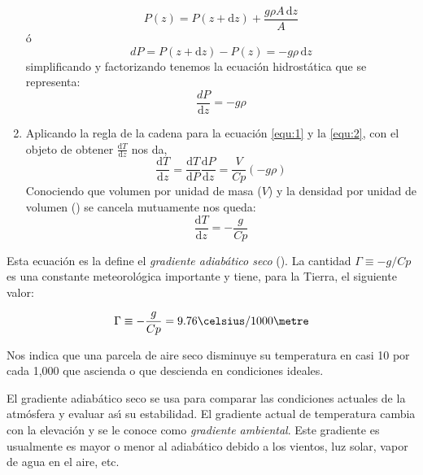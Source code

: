 \begin{enumerate}
\begin{equation}
P(z) = P(z+\mathrm{d}z) +\frac{g \rho A\,\mathrm{d}z}{A}
\end{equation}
\'o
\begin{equation}
dP =P(z+\mathrm{d}z) - P(z) = -g\rho\, \mathrm{d}z
\end{equation}
simplificando y factorizando tenemos la ecuaci\'on hidrost\'atica que se representa:
\begin{equation}
\frac{dP}{\mathrm{d}z}= -g\rho
\label{equ:2}
\end{equation}
\item Aplicando la regla de la cadena para  la ecuaci\'on \ref{equ:1}  y la   \ref{equ:2}, 
con el objeto de obtener $\frac{\mathrm{d}T}{\mathrm{d}z}$ nos da,
\begin{equation}
\frac{\mathrm{d}T}{\mathrm{d}z}=\frac{\mathrm{d}T}{\mathrm{d}P}\frac{\mathrm{d}P}{\mathrm{d}z} =\frac{V}{Cp}(-g\rho)
\end{equation}
Conociendo que volumen por unidad de masa ($V$) y la densidad por unidad de volumen () se cancela mutuamente nos queda:
\begin{equation}
\frac{\mathrm{d}T}{\mathrm{d}z}=-\frac{g}{Cp}
\label{equ:3}
\end{equation}
\end{enumerate}

Esta ecuaci\'on es la define el \textit{gradiente adiab\'atico seco} (). La cantidad $\Gamma\equiv-g/Cp$  es una constante meteorol\'ogica importante y tiene, para la Tierra, el siguiente valor:

$$\Gamma \equiv-\frac{g}{Cp}=9.76{\celsius}/1000{\metre}$$

Nos indica que una parcela de aire seco disminuye su temperatura en casi 10{\celsius} por cada 1,000{\metre} que ascienda o que descienda en condiciones ideales.

El gradiente adiab\'atico seco se usa para comparar las condiciones actuales de la atm\'osfera y evaluar as\'{\i} su estabilidad. El gradiente actual de temperatura cambia con la elevaci\'on y se le conoce como  \textit{gradiente ambiental}. Este gradiente es usualmente es mayor o menor al adiab\'atico debido a los vientos, luz solar, vapor de agua en el aire, etc.

